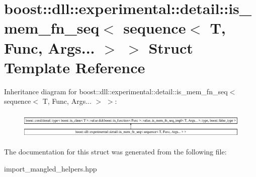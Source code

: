 \hypertarget{a00174}{}\section{boost\+:\+:dll\+:\+:experimental\+:\+:detail\+:\+:is\+\_\+mem\+\_\+fn\+\_\+seq$<$ sequence$<$ T, Func, Args... $>$ $>$ Struct Template Reference}
\label{a00174}
Inheritance diagram for boost\+:\+:dll\+:\+:experimental\+:\+:detail\+:\+:is\+\_\+mem\+\_\+fn\+\_\+seq$<$ sequence$<$ T, Func, Args... $>$ $>$\+:\begin{figure}[H]
\begin{center}
\leavevmode
\includegraphics[height=1.294798cm]{a00174}
\end{center}
\end{figure}


The documentation for this struct was generated from the following file\+:\begin{DoxyCompactItemize}
\item 
import\+\_\+mangled\+\_\+helpers.\+hpp\end{DoxyCompactItemize}

